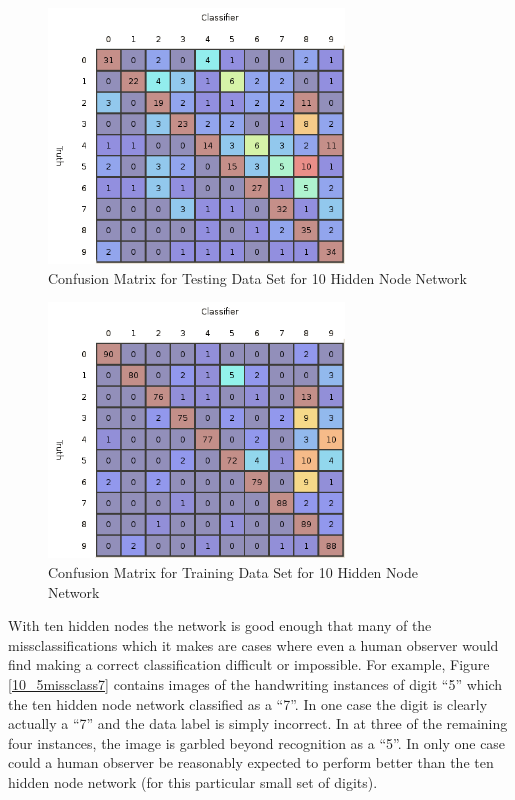 \documentclass{article}
\begin{document}
\begin{figure}
\centering
\includegraphics[width=0.7\textwidth]{data/final/10_test_confusion.png}
\caption{Confusion Matrix for Testing Data Set for 10 Hidden Node Network}
\label{testconfusion10}
\end{figure}

\begin{figure}
\centering
\includegraphics[width=0.7\textwidth]{data/final/10_train_confusion.png}
\caption{Confusion Matrix for Training Data Set for 10 Hidden Node Network}
\label{trainconfusion10}
\end{figure}

With ten hidden nodes the network is good enough that many of the missclassifications which it makes are cases where even a human observer would find making a correct classification difficult or impossible. For example, Figure \ref{10_5missclass7} contains images of the handwriting instances of digit ``5'' which the ten hidden node network classified as a ``7''. In one case the digit is clearly actually a ``7'' and the data label is simply incorrect. In at three of the remaining four instances, the image is garbled beyond recognition as a ``5''. In only one case could a human observer be reasonably expected to perform better than the ten hidden node network (for this particular small set of digits).
\end{document}
